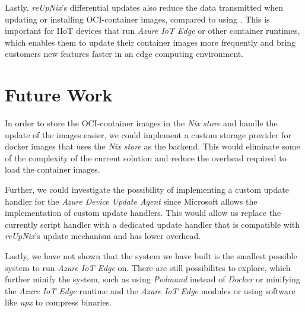 Lastly, \textit{reUpNix}'s differential updates also reduce the data transmitted
when updating or installing \ac{OCI}-container images, compared to using .
This is important for \ac{IIoT} devices that run \textit{Azure IoT Edge} or other
container runtimes, which enables them to update their container images more frequently
and bring customers new features faster in an edge computing environment.


\section{Future Work}
In order to store the \ac{OCI}-container images in the \textit{Nix store} and
handle the update of the images easier, we could implement a custom storage
provider for docker images that uses the \textit{Nix store} as the backend.
This would eliminate some of the complexity of the current solution and reduce
the overhead required to load the container images.

Further, we could investigate the possibility of implementing a custom update
handler for the \textit{Azure Device Update Agent} since Microsoft allows
the implementation of custom update handlers. This would allow us replace the
currently script handler with a dedicated update handler that is compatible
with \textit{reUpNix}'s update mechanism and has lower overhead.

Lastly, we have not shown that the system we have built is the smallest possible
system to run \textit{Azure IoT Edge} on. There are still possibilites to explore, which
further minify the system, such as using \textit{Podmand} instead of \textit{Docker}
or minifying the \textit{Azure IoT Edge} runtime and the \textit{Azure IoT Edge} modules
or using software like \textit{upx} to compress binaries.
